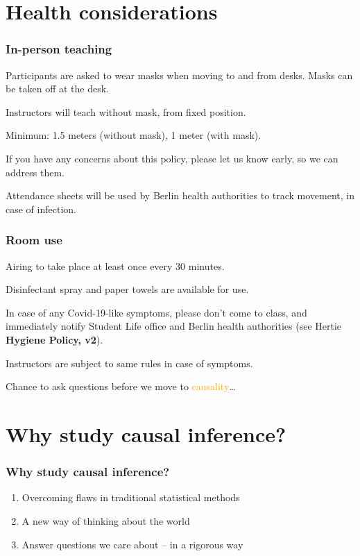 \documentclass[12pt,english,dvipsnames,aspectratio=169, handout]{beamer}
\begin{document}
\section{Health considerations}
\begin{frame}
	\frametitle{In-person teaching}
	Participants are asked to wear masks when moving to and from desks. Masks can be taken off at the desk.\bigskip
	
	Instructors will teach without mask, from fixed position.\bigskip
	
	Minimum: 1.5 meters (without mask), 1 meter (with mask).\bigskip
	
	If you have any concerns about this policy, please let us know early, so we can address them.\bigskip
	
	Attendance sheets will be used by Berlin health authorities to track movement, in case of infection.
	
\end{frame}


\begin{frame}
	\frametitle{Room use}
	Airing to take place at least once every 30 minutes.\bigskip
	
	Disinfectant spray and paper towels are available for use.\bigskip
	
	In case of any Covid-19-like symptoms, please don't come to class, and immediately notify Student Life office and Berlin health authorities (see Hertie \textbf{Hygiene Policy, v2}).\bigskip
	
	Instructors are subject to same rules in case of symptoms.
	
\end{frame}



\begin{frame}[plain]
	\begin{center}
		\Huge Chance to ask questions before we move to \textcolor{orange}{causality}\dots 
	\end{center}
\end{frame}

\section{Why study causal inference?}

\begin{frame}
	\frametitle{Why study causal inference?}
	\begin{enumerate}
		\setlength\itemsep{1.5em}
		\item Overcoming flaws in traditional statistical methods
		\item A new way of thinking about the world
		\item Answer questions we care about -- in a rigorous way
	\end{enumerate}
	
\end{frame}
\end{document}
